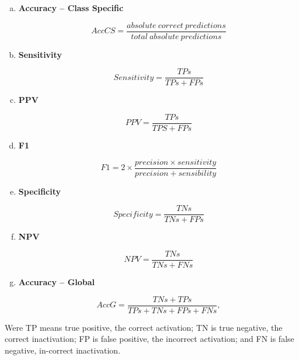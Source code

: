 \documentclass[a4paper, 12pt]{ppgeb}
\begin{document}
\begin{enumerate}[(a)]
    \item \textbf{Accuracy – Class Specific}
    
    \begin{equation}\label{eq:AccCS}
    AccCS = \frac{absolute \:correct \:predictions}{total \:absolute \:predictions}
    \end{equation}

    \item \textbf{Sensitivity}
    
    \begin{equation}\label{eq:Sensitivity}
    Sensitivity = \frac{TPs}{TPs + FPs}
    \end{equation}

    \item \textbf{PPV}
    
    \begin{equation}\label{eq:PPV}
    PPV = \frac{TPs}{TPS + FPs}
    \end{equation}
    
    \item \textbf{F1}

    \begin{equation}\label{eq:F1}
    F1 = 2 \times \frac{precision \times sensitivity}{precision + sensibility}
    \end{equation}
    
    \item \textbf{Specificity}
    
    \begin{equation}\label{eq:Specificity}
    Specificity = \frac{TNs}{TNs + FPs}
    \end{equation}
    
    \item \textbf{NPV}
    
    \begin{equation}\label{eq:NPV}
    NPV = \frac{TNs}{TNs + FNs}
    \end{equation}
    
    \item \textbf{Accuracy – Global}
    
    \begin{equation}\label{eq:AccG}
    AccG = \frac{TNs + TPs}{TPs + TNs + FPs + FNs},
    \end{equation}

\end{enumerate}

Were TP means true positive, the correct activation; TN is true negative, the correct inactivation; FP is false positive, the incorrect activation; and FN is false negative, in-correct inactivation.
\end{document}
